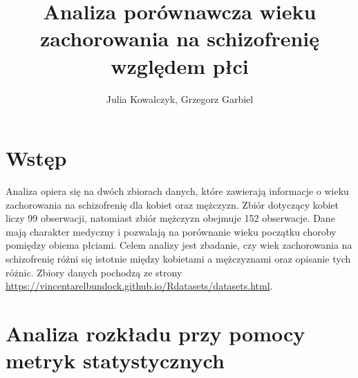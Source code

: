 \documentclass{mwart}
\begin{document}
	\title{Analiza porównawcza wieku zachorowania na schizofrenię względem płci}
	\author{Julia Kowalczyk, Grzegorz Garbiel}
	\maketitle
	\newpage
	\section{Wstęp}
	\noindent
	Analiza opiera się na dwóch zbiorach danych, które zawierają informacje o wieku zachorowania na schizofrenię dla kobiet oraz mężczyzn. Zbiór dotyczący kobiet liczy 99 obserwacji, natomiast zbiór mężczyzn obejmuje 152 obserwacje. Dane mają charakter medyczny i pozwalają na porównanie wieku początku choroby pomiędzy obiema płciami. Celem analizy jest zbadanie, czy wiek zachorowania na schizofrenię różni się istotnie między kobietami a mężczyznami oraz opisanie tych różnic.
	\noindent
	Zbiory danych pochodzą ze strony \href{https://vincentarelbundock.github.io/Rdatasets/datasets.html}{https://vincentarelbundock.github.io/Rdatasets/datasets.html}.
	
	
	
	\section{Analiza rozkładu przy pomocy metryk statystycznych}
\end{document}
